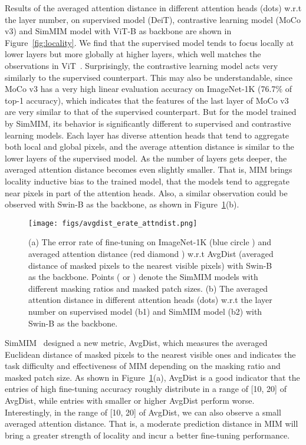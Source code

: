 \documentclass{article}
\begin{document}
Results of the averaged attention distance in different attention heads (dots) w.r.t the layer number, on supervised model (DeiT), contrastive learning model (MoCo v3) and SimMIM model with ViT-B as backbone are shown in Figure~\ref{fig:locality}. 
We find that the supervised model tends to focus locally at lower layers but more globally at higher layers, which well matches the observations in ViT~\cite{dosovitskiy2020vit}. Surprisingly, the contrastive learning model acts very similarly to the supervised counterpart. This may also be understandable, since MoCo v3 has a very high linear evaluation accuracy on ImageNet-1K (76.7\% of top-1 accuracy), which indicates that the features of the last layer of MoCo v3 are very similar to that of the supervised counterpart.
But for the model trained by SimMIM, its behavior is significantly different to supervised and contrastive learning models. Each layer has diverse attention heads that tend to aggregate both local and global pixels, and the average attention distance is similar to the lower layers of the supervised model. As the number of layers gets deeper, the averaged attention distance becomes even slightly smaller. That is, MIM brings locality inductive bias to the trained model, that the models tend to aggregate near pixels in part of the attention heads. Also, a similar observation could be observed with Swin-B as the backbone, as shown in Figure~\ref{fig:avgdist}(b).

\begin{figure}
    \centering
    \texttt{[image: figs/avgdist\_erate\_attndist.png]}
	    \vspace{-1.5em}
    \caption{(a) The error rate of fine-tuning on ImageNet-1K (blue circle \textcolor{blue}{}) and averaged attention distance (red diamond \textcolor{red}{}) w.r.t AvgDist (averaged distance of masked pixels to the nearest visible pixels) with Swin-B as the backbone. Points (\textcolor{red}{} or \textcolor{blue}{}) denote the SimMIM models with different masking ratios and masked patch sizes. (b) The averaged attention distance in different attention heads (dots) w.r.t the layer number on supervised model (b1) and SimMIM model (b2) with Swin-B as the backbone.}
    \label{fig:avgdist}
\end{figure}


SimMIM~\cite{xie2021simmim} designed a new metric, AvgDist, which measures the averaged Euclidean distance of masked pixels to the nearest visible ones and indicates the task difficulty and effectiveness of MIM depending on the masking ratio and masked patch size. As shown in Figure~\ref{fig:avgdist}(a), AvgDist is a good indicator that the entries of high fine-tuning accuracy roughly distribute in a range of [10, 20] of AvgDist, while entries with smaller or higher AvgDist perform worse. Interestingly, in the range of [10, 20] of AvgDist, we can also observe a small averaged attention distance. That is, a moderate prediction distance in MIM will bring a greater strength of locality and incur a better fine-tuning performance.
\end{document}
